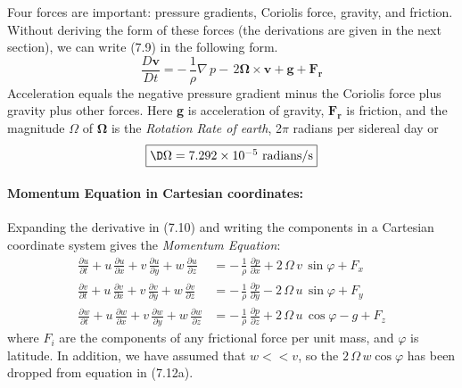 Four forces are important: pressure gradients, Coriolis force, gravity, and
friction. Without deriving the form of these forces (the derivations are given
in the next section), we can write (7.9) in the following form.
\begin{equation}
\frac{D\mathbf{v}}{Dt} = -\,\frac{1}{\rho}\nabla\,p -
\,2\boldsymbol{\Omega}
\times \mathbf{v} + \mathbf{g} + \mathbf{F_r}
\end{equation}
Acceleration equals the negative pressure gradient minus the Coriolis force plus gravity plus other forces. Here
\textbf{g} is acceleration of gravity, $\mathbf{F_r}$ is friction, and the magnitude $\Omega$ of
$\boldsymbol{\Omega}$ is the \textit{Rotation Rate of earth}, 2$\pi$ radians per sidereal day or
\begin{equation}
\fbox{$\D
\Omega = 7.292 \times 10^{-5} \text{ radians/s} $}
\end{equation}

\paragraph{Momentum Equation in Cartesian coordinates:}
Expanding the derivative in (7.10) and writing the components
in a Cartesian coordinate system gives the \textit{Momentum Equation}:
\begin{subequations}
\begin{align}
\frac{\partial{u}}{\partial{t}} + u\,\frac{\partial{u}}{\partial{x}}
+ v\,\frac{\partial{u}}{\partial{y}} +w\,\frac{\partial{u}}{\partial{z}} &=
-\,\frac{1}{\rho}\,\frac{\partial{p}}{\partial{x}} +
2\,\Omega\,{v}\,\sin\varphi +  F_x \\
 \frac{\partial{v}}{\partial{t}} + u\,\frac{\partial{v}}{\partial{x}} +
v\,\frac{\partial{v}}{\partial{y}} +w\,\frac{\partial{v}}{\partial{z}} &=
-\,\frac{1}{\rho}\,\frac{\partial{p}}{\partial{y}} - 2\,\Omega\,u\,\sin\varphi
+ F_y
\\
 \frac{\partial{w}}{\partial{t}} + u\,\frac{\partial{w}}{\partial{x}} +
v\,\frac{\partial{w}}{\partial{y}} +w\,\frac{\partial{w}}{\partial{z}} &=
-\,\frac{1}{\rho}\,\frac{\partial{p}}{\partial{z}} + 2\,\Omega\,{u}\,\cos\varphi
- g + F_z
\end{align}
\end{subequations}
where $F_i$ are the components of any frictional force per unit mass, and
$\varphi$ is latitude. In addition, we have assumed that $w << v$, so the
$2\,\Omega\,w \cos \varphi$ has been dropped from equation in (7.12a).

